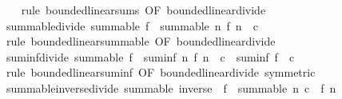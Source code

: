 \begin{isabellebody}
%
\isadelimproof
\ \ %
\endisadelimproof
%
\isatagproof
{}\isamarkupfalse%
\ {\isacharparenleft}{\kern0pt}rule\ bounded{\isacharunderscore}{\kern0pt}linear{\isachardot}{\kern0pt}sums\ {\isacharbrackleft}{\kern0pt}OF\ bounded{\isacharunderscore}{\kern0pt}linear{\isacharunderscore}{\kern0pt}divide{\isacharbrackright}{\kern0pt}{\isacharparenright}{\kern0pt}%
\endisatagproof
{\isafoldproof}%
%
\isadelimproof
\isanewline
%
\endisadelimproof
\isanewline
{}\isamarkupfalse%
\ summable{\isacharunderscore}{\kern0pt}divide{\isacharcolon}{\kern0pt}\ {\isachardoublequoteopen}summable\ f\ {\isasymLongrightarrow}\ summable\ {\isacharparenleft}{\kern0pt}{\isasymlambda}n{\isachardot}{\kern0pt}\ f\ n\ {\isacharslash}{\kern0pt}\ c{\isacharparenright}{\kern0pt}{\isachardoublequoteclose}\isanewline
%
\isadelimproof
\ \ %
\endisadelimproof
%
\isatagproof
{}\isamarkupfalse%
\ {\isacharparenleft}{\kern0pt}rule\ bounded{\isacharunderscore}{\kern0pt}linear{\isachardot}{\kern0pt}summable\ {\isacharbrackleft}{\kern0pt}OF\ bounded{\isacharunderscore}{\kern0pt}linear{\isacharunderscore}{\kern0pt}divide{\isacharbrackright}{\kern0pt}{\isacharparenright}{\kern0pt}%
\endisatagproof
{\isafoldproof}%
%
\isadelimproof
\isanewline
%
\endisadelimproof
\isanewline
{}\isamarkupfalse%
\ suminf{\isacharunderscore}{\kern0pt}divide{\isacharcolon}{\kern0pt}\ {\isachardoublequoteopen}summable\ f\ {\isasymLongrightarrow}\ suminf\ {\isacharparenleft}{\kern0pt}{\isasymlambda}n{\isachardot}{\kern0pt}\ f\ n\ {\isacharslash}{\kern0pt}\ c{\isacharparenright}{\kern0pt}\ {\isacharequal}{\kern0pt}\ suminf\ f\ {\isacharslash}{\kern0pt}\ c{\isachardoublequoteclose}\isanewline
%
\isadelimproof
\ \ %
\endisadelimproof
%
\isatagproof
{}\isamarkupfalse%
\ {\isacharparenleft}{\kern0pt}rule\ bounded{\isacharunderscore}{\kern0pt}linear{\isachardot}{\kern0pt}suminf\ {\isacharbrackleft}{\kern0pt}OF\ bounded{\isacharunderscore}{\kern0pt}linear{\isacharunderscore}{\kern0pt}divide{\isacharcomma}{\kern0pt}\ symmetric{\isacharbrackright}{\kern0pt}{\isacharparenright}{\kern0pt}%
\endisatagproof
{\isafoldproof}%
%
\isadelimproof
\isanewline
%
\endisadelimproof
\isanewline
{}\isamarkupfalse%
\ summable{\isacharunderscore}{\kern0pt}inverse{\isacharunderscore}{\kern0pt}divide{\isacharcolon}{\kern0pt}\ {\isachardoublequoteopen}summable\ {\isacharparenleft}{\kern0pt}inverse\ {\isasymcirc}\ f{\isacharparenright}{\kern0pt}\ {\isasymLongrightarrow}\ summable\ {\isacharparenleft}{\kern0pt}{\isasymlambda}n{\isachardot}{\kern0pt}\ c\ {\isacharslash}{\kern0pt}\ f\ n{\isacharparenright}{\kern0pt}{\isachardoublequoteclose}\isanewline

\end{isabellebody}
